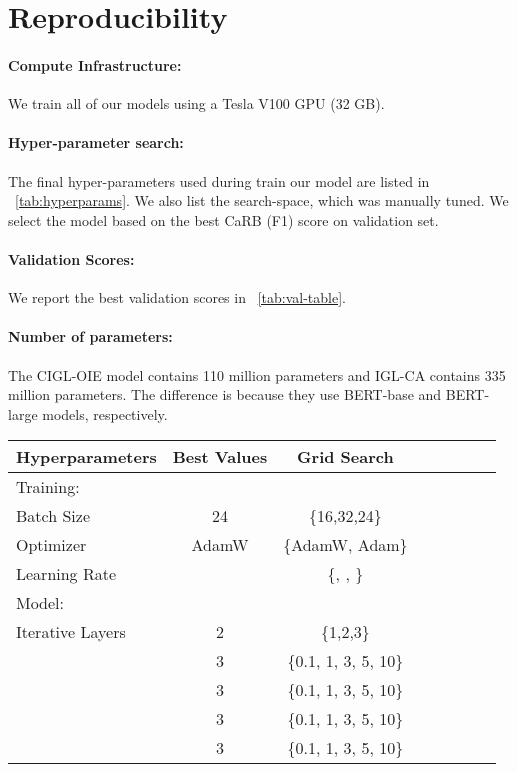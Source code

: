 \documentclass[11pt,a4paper]{article}
\newcommand{\shortname}{{\scshape IGL}}
\begin{document}
%
 
\section{Reproducibility}
\label{sec:reproducibility}

\paragraph{Compute Infrastructure:} We train all of our models using a Tesla V100 GPU (32 GB). 
\paragraph{Hyper-parameter search:}
The final hyper-parameters used during train our model are listed in \tablename~\ref{tab:hyperparams}. We also list the search-space, which was manually tuned. We select the model based on the best CaRB (F1) score on validation set. 
\paragraph{Validation Scores:} We report the best validation scores in \tablename~\ref{tab:val-table}.
\paragraph{Number of parameters:} The C\shortname-OIE model contains 110 million parameters and \shortname-CA contains 335 million parameters. The difference is because they use BERT-base and BERT-large models, respectively.

\begin{table*}
\centering
\begin{tabular}{lccccccc}
\toprule
Hyperparameters & Best Values & Grid Search \\
\midrule   
Training: \\
Batch Size & 24 & \{16,32,24\}\\
Optimizer & AdamW & \{AdamW, Adam\}\\
Learning Rate &  & \{, , \}\\
\midrule
Model: \\
Iterative Layers & 2 & \{1,2,3\} \\
 & 3 & \{0.1, 1, 3, 5, 10\} \\
 & 3 & \{0.1, 1, 3, 5, 10\} \\
 & 3 & \{0.1, 1, 3, 5, 10\} \\
 & 3 & \{0.1, 1, 3, 5, 10\} \\
\bottomrule
\end{tabular}
\caption{Hyperparameter settings.}
\label{tab:hyperparams}
\end{table*}
\end{document}

